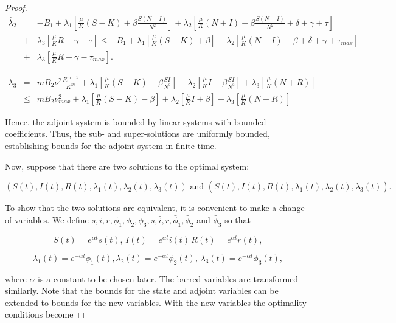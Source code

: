 \begin{proof}
\begin{eqnarray*}
	\dot{\lambda_2}&=& -B_1+\lambda_1\left[\frac{\mu}{K}(S-K)+\beta\frac{S(N-I)}{N^2}\right]+\lambda_2\left[\frac{\mu}{K}(N+I)-\beta\frac{S(N-I)}{N^2}+\delta+\gamma+\tau \right]\\
	&+&\lambda_3\left[\frac{\mu}{K}R-\gamma-\tau\right]\leq-B_1+\lambda_1\left[\frac{\mu}{K}(S-K)+\beta\right]+\lambda_2\left[\frac{\mu}{K}(N+I)-\beta+\delta+\gamma+\tau_{max} \right]\\
	&+&\lambda_3\left[\frac{\mu}{K}R-\gamma-\tau_{max}\right].
\end{eqnarray*}
	
\begin{eqnarray*}
	\dot{\lambda_3}&=& mB_2\nu^2\frac{R^{m-1}}{K^m}+\lambda_1\left[\frac{\mu}{K}(S-K)-\beta\frac{SI}{N^2}\right]+\lambda_2\left[\frac{\mu}{K}I+\beta\frac{SI}{N^2}\right]+\lambda_3\left[\frac{\mu}{K}(N+R)\right]\\
	&\leq& mB_2\nu^2_{max}+\lambda_1\left[\frac{\mu}{K}(S-K)-\beta\right]+\lambda_2\left[\frac{\mu}{K}I+\beta\right]+\lambda_3\left[\frac{\mu}{K}(N+R)\right]
\end{eqnarray*}

Hence, the adjoint system is bounded by linear systems with bounded coefficients. Thus, the sub- and super-solutions are uniformly bounded, establishing bounds for the adjoint system in finite time.

Now, suppose that there are two solutions to the optimal system:

$$(S(t),I(t),R(t),\lambda_1(t),\lambda_2(t),\lambda_3(t))\,\,\mbox{and}\,\, (\bar{S}(t),\bar{I}(t),\bar{R}(t),\bar{\lambda}_1(t),\bar{\lambda}_2(t),\bar{\lambda}_3(t)).$$

To show that the two solutions are equivalent, it is convenient to make a change of variables. We define $s,i,r,\phi_1,\phi_2,\phi_3,\bar{s},\bar{i},\bar{r},\bar{\phi}_1,\bar{\phi}_2$ and $\bar{\phi}_3$ so that

$$S(t)=e^{\alpha t}s(t),\, I(t)=e^{\alpha t}i(t)\, R(t)=e^{\alpha t}r(t),$$

$$\lambda_1(t)=e^{-\alpha t}\phi_1(t), \lambda_2(t)=e^{-\alpha t}\phi_2(t),\, \lambda_3(t)=e^{-\alpha t}\phi_3(t),$$

where $\alpha$ is a constant to be chosen later. The barred variables are transformed similarly. Note that the bounds for the state and adjoint variables can be extended to bounds for the new variables. With the new variables the optimality conditions become


\end{proof}
